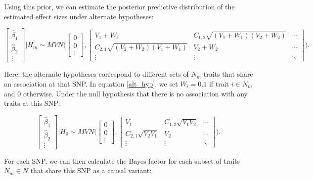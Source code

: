 \documentclass{article}
\begin{document}
\noindent Using this prior, we can estimate the posterior predictive distribution of the estimated effect sizes under alternate hypotheses:

\begin{equation}
\label{alt_hyp}
\begin{bmatrix}
\hat{\beta}_1 \\
\hat{\beta}_2 \\
\vdots
\end{bmatrix} | H_m
\sim MVN \Bigg(
\begin{bmatrix}
0 \\
0 \\
\vdots
\end{bmatrix},
\begin{bmatrix}
V_1 + W_1 & C_{1,2} \sqrt{(V_1 + W_1) (V_2 + W_2)} & \cdots \\
C_{2,1} \sqrt{(V_2 + W_2) (V_1 + W_1)} & V_2 + W_2 & \cdots \\
\vdots & \vdots & \ddots
\end{bmatrix}
\Bigg).
\end{equation}

\noindent Here, the alternate hypotheses correspond to different sets of $N_m$ traits that share an association at that SNP. In equation \ref{alt_hyp}, we set $W_i = 0.1$ if trait $i \in N_m$ and 0 otherwise. Under the null hypothesis that there is no association with any traits at this SNP:

\begin{equation}
\label{null_hyp}
\begin{bmatrix}
\hat{\beta}_1 \\
\hat{\beta}_2 \\
\vdots
\end{bmatrix} | H_0
\sim MVN \Bigg(
\begin{bmatrix}
0 \\
0 \\
\vdots
\end{bmatrix},
\begin{bmatrix}
V_1 & C_{1,2} \sqrt{V_1 V_2} & \cdots \\
C_{2,1} \sqrt{V_2 V_1} & V_2 & \cdots \\
\vdots & \vdots & \ddots
\end{bmatrix}
\Bigg).
\end{equation}


\noindent For each SNP, we can then calculate the Bayes factor for each subset of traits $N_m \in N$ that share this SNP as a causal variant:
\end{document}
